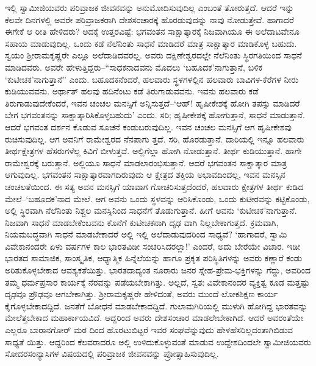 ಇಲ್ಲಿ ಸ್ವಾಮೀಜಿಯವರು ಪರಿವ್ರಾಜಕ ಜೀವನವನ್ನು ಅನುಮೋದಿಸುವುದಿಲ್ಲ ಎಂಬಂತೆ ತೋರುತ್ತದೆ. ಆದರೆ ಇನ್ನು ಕೆಲವೇ ದಿನಗಳಲ್ಲಿ ಅವರೇ ಪರಿವ್ರಾಜಕರಾಗಿ ದೇಶಸಂಚಾರಕ್ಕೆ ಹೊರಡುವುದನ್ನು ನಾವು ನೋಡುತ್ತೇವೆ. ಹಾಗಾದರೆ ಈಗೇಕೆ ಆ ರೀತಿ ಹೇಳಿದರು? ಅದಕ್ಕೆ ಉತ್ತರವಿಷ್ಟೆ: ಭಗವಂತನ ಸಾಕ್ಷಾತ್ಕಾರಕ್ಕೆ ನಿಜವಾಗಿಯೂ ಈ ಅಲೆದಾಟವೇನೂ ಸಹಾಯ ಮಾಡುವುದಿಲ್ಲ. ಒಂದು ಕಡೆ ನೆಲೆನಿಂತು ಸಾಧನೆ ಮಾಡಿದರೆ ಮಾತ್ರ ಸಾಕ್ಷಾತ್ಕಾರ ಮಾಡಿಕೊಳ್ಳ ಬಹುದು. ಸ್ವಯಂ ಶ್ರೀರಾಮಕೃಷ್ಣರೇ ಎಲ್ಲೂ ಅಲೆದಾಡಿದವರಲ್ಲ. ಅವರು ದಕ್ಷಿಣೇಶ್ವರದಲ್ಲೇ ನೆಲೆನಿಂತು ಸ್ಥಿರಗತಿಯಿಂದ ಸಾಧನೆ ಮಾಡಿದವರು. ಅವರೇ ಹೇಳುತ್ತಿದ್ದರು–“ಸಾಧಕನಾದವನು ಮೊದಲು ‘ಬಹೂದಕ’ನಾಗುತ್ತಾನೆ, ಬಳಿಕ ‘ಕುಟೀಚಕ’ನಾಗುತ್ತಾನೆ” ಎಂದು. ಬಹೂದಕನೆಂದರೆ, ಹಲವಾರು ಸ್ಥಳಗಳಲ್ಲಿನ ಹಲವಾರು ಬಾವಿಗಳ-ಕೆರೆಗಳ ನೀರು ಕುಡಿಯುವವನು. ಅರ್ಥಾತ್ ಹಲವು ಹದಿನೆಂಟು ಕಡೆ ತಿರುಗಾಡುವವನು. ಇವನು ಹಲವಾರು ಕಡೆ ತಿರುಗಾಡುವುದೇಕೆಂದರೆ, ಇವನ ಚಂಚಲ ಮನಸ್ಸಿಗೆ ಅನ್ನಿಸುತ್ತದೆ–‘ಆಹ್! ಹೃಷೀಕೇಶಕ್ಕೆ ಹೋಗಿ ತಪಸ್ಸು ಮಾಡಿದರೆ ಬೇಗ ಭಗವಂತನನ್ನು ಸಾಕ್ಷಾತ್ಕಾರಿಸಿಕೊಳ್ಳಬಹುದು’ ಎಂದು. ಸರಿ; ಹೃಷೀಕೇಶಕ್ಕೆ ಹೋಗುತ್ತಾನೆ, ಸಾಧನೆ ಮಾಡುತ್ತಾನೆ. ಆದರೆ ಭಗವಂತ ದರ್ಶನ ಕೊಡುವ ಸೂಚನೆ ಕಂಡುಬರುವುದಿಲ್ಲ. ಇವನ ಚಂಚಲ ಮನಸ್ಸಿಗೆ ಆಗ ಹೃಷೀಕೇಶವು ರುಚಿಸುವುದಿಲ್ಲ. ಆಗ ಅವನಿಗೆ ರಾಮೇಶ್ವರದ ನೆನಪಾಗು ತ್ತದೆ. ಸರಿ, ಹೊರಡುತ್ತಾನೆ. ದಾರಿಯಲ್ಲಿ ಇನ್ನೂ ಹಲವಾರು ತೀರ್ಥಕ್ಷೇತ್ರಗಳ ಹೆಸರುಗಳೆಲ್ಲ ಕಿವಿಗೆ ಬೀಳುತ್ತವೆ. ಅಲ್ಲಿಗೆಲ್ಲಾ ಹೋಗಿ ನೋಡುತ್ತಾನೆ. ತೀರ್ಥ ಕುಡಿಯುತ್ತಾನೆ. ಹಾಗೇ ರಾಮೇಶ್ವರಕ್ಕೆ ಬರುತ್ತಾನೆ. ಅಲ್ಲಿಯೂ ಸಾಧನೆ ಮಾಡಲಾರಂಭಿಸುತ್ತಾನೆ. ಆದರೆ ಭಗವಂತನ ಸಾಕ್ಷಾತ್ಕಾರ ಮಾತ್ರ ಆಗುವುದಿಲ್ಲ. ಭಗವಂತನ ಸಾಕ್ಷಾತ್ಕಾರವಾಗದಿರುವುದು ಆ ಕ್ಷೇತ್ರದ ಶಕ್ತಿಯ ಅಭಾವದಿಂದಲ್ಲ, ಇವನ ಮನಸ್ಸಿನ ಚಂಚಲತೆಯಿಂದ. ಈ ಸತ್ಯ ಅವನ ಮನಸ್ಸಿಗೆ ಯಾವಾಗ ಗೋಚರಿಸುತ್ತದೆಂದರೆ, ಹಲವಾರು ಕ್ಷೇತ್ರಗಳ ತೀರ್ಥ ಕುಡಿದ ಮೇಲೆ–‘ಬಹೂದಕ’ನಾದ ಮೇಲೆ. ಆಗ ಅವನು ಒಂದು ಸ್ಥಳವನ್ನು ಆರಿಸಿಕೊಂಡು, ಒಂದು ಕುಟೀರವನ್ನು ಕಟ್ಟಿಕೊಂಡು, ಅಲ್ಲಿ ಸ್ಥಿರವಾಗಿ ನೆಲೆನಿಂತು ನಿಶ್ಚಲ ಮನಸ್ಸಿನಿಂದ ಸಾಧನೆಗೆ ತೊಡುಗುತ್ತಾನೆ. ಹೀಗೆ ಅವನು ‘ಕುಟೀಚಕ’ನಾಗುತ್ತಾನೆ. ನಿಜವಾಗಿ ಸಾಧನೆ ಮಾಡಬೇಕೆಂಬವನು ಕೊನೆಗೆ ಕುಟೀಚಕನಾಗಿ ದೃಢ ವಾಗಿ ನಿಲ್ಲಬೇಕಾಗುತ್ತದೆ. ಕ್ರಮವಾಗಿ, ನಿಯಮಬದ್ಧವಾಗಿ ಸಾಧನೆ ಮಾಡಬೇಕಾದರೆ ಅಲ್ಲಿ ಇಲ್ಲಿ ಅಲೆದಾಡುವುದರಿಂದ ಸಾಧ್ಯವೆ? ‘ಹಾಗಾದರೆ, ಸ್ವಾಮಿ ವಿವೇಕಾನಂದರೇ ಏಳು ವರ್ಷಗಳ ಕಾಲ ಭಾರತವಿಡೀ ಸಂಚರಿಸಿದರಲ್ಲಾ!’ ಎಂದರೆ, ಅದು ಬೇರೆಯೇ ವಿಚಾರ. ಇಡೀ ಭಾರತದ ಸಾಮಾಜಿಕ, ಸಾಂಸ್ಕೃತಿಕ, ಆಧ್ಯಾತ್ಮಿಕ ಹಿನ್ನೆಲೆಯನ್ನು ಹಾಗೂ ಪ್ರಕೃತ ಪರಿಸ್ಥಿತಿಗಳನ್ನು ಅವರು ಕಣ್ಣಾರೆ ಕಂಡು ಅರಿತುಕೊಳ್ಳಬೇಕಾದ ಆವಶ್ಯಕತೆಯಿತ್ತು. ಭಾರತದಾದ್ಯಂತ ನೂರಾರು ಜನರ ಸ್ನೇಹ-ಪ್ರೇಮ-ಭಕ್ತಿಗಳನ್ನು ಗೆದ್ದು, ಅವರಿಂದ ತಮ್ಮ ಧರ್ಮಪ್ರಸಾರ ಕಾರ್ಯಕ್ಕೆ ನೆರವನ್ನು ಪಡೆಯಬೇಕಾಗಿತ್ತು. ಅಲ್ಲದೆ, ಸ್ವತಃ ವಿವೇಕಾನಂದರ ವ್ಯಕ್ತಿತ್ವ ಕೂಡ ಮತ್ತಷ್ಟು ದೃಢವೂ ಪ್ರೌಢವೂ ಆಗಬೇಕಾಗಿತ್ತು. ಶ್ರೀರಾಮಕೃಷ್ಣರೇ ಹೇಳಿದಂತೆ, ಅವರು ಮುಂದೆ ಲೋಕಶಿಕ್ಷಣ ಕಾರ್ಯ ಕೈಗೊಳ್ಳಬೇಕಾದದ್ದಿದೆ. ಜನತೆಗೆ ಬೋಧನೆ ಮಾಡಬೇಕಾದದ್ದಿದೆ. ಗುಲಾಮಗಿರಿಯಲ್ಲಿ ಮುಳುಗಿ ಹೋಗಿದ್ದ ಭಾರತವನ್ನು ಮೇಲೆತ್ತಬೇಕಾದ ಮಹಾರ್ಕಾಯವಿದೆ. ಆದ್ದರಿಂದ ಅವರು ದೇಶಸಂಚಾರ ಮಾಡಲೇಬೇಕಾಗಿದೆ. ಆದರೆ ಅವರಂತೆಯೇ ಎಲ್ಲರೂ ಬಾರಾನಗೋರ್ ಮಠ ದಿಂದ ಹೊರಟುಬಿಟ್ಟರೆ ಇವರ ಸಂಘವೆನ್ನುವುದು ಹೇಳಹೆಸರಿಲ್ಲದಂತಾಗಿಬಿಡುವ ಸಾಧ್ಯತೆ ಯಿತ್ತು. ಆದ್ದರಿಂದ ಕೆಲವರಾದರೂ ಅಲ್ಲಿ ಉಳಿದುಕೊಳ್ಳುವಂತೆ ಮಾಡುವ ಉದ್ದೇಶದಿಂದಲೇ ಸ್ವಾಮೀಜಿಯವರು ಸೋದರಸಂನ್ಯಾಸಿಗಳ ವಿಷಯದಲ್ಲಿ ಪರಿವ್ರಾಜಕ ಜೀವನವನ್ನು ಪ್ರೋತ್ಸಾಹಿಸುವುದಿಲ್ಲ.


